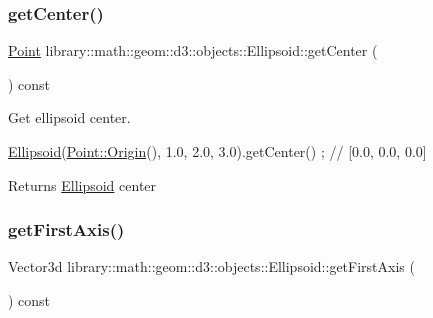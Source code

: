 \subsubsection{\texorpdfstring{get\+Center()}{getCenter()}}
{\footnotesize\ttfamily \hyperlink{classlibrary_1_1math_1_1geom_1_1d3_1_1objects_1_1_point}{Point} library\+::math\+::geom\+::d3\+::objects\+::\+Ellipsoid\+::get\+Center (\begin{DoxyParamCaption}{ }\end{DoxyParamCaption}) const}



Get ellipsoid center. 


\begin{DoxyCode}
\hyperlink{classlibrary_1_1math_1_1geom_1_1d3_1_1objects_1_1_ellipsoid_aae81fe0edc7f0e8d4590ea89ae73cb14}{Ellipsoid}(\hyperlink{classlibrary_1_1math_1_1geom_1_1d3_1_1objects_1_1_point_ab2a38e285c562e50bf350272c083986f}{Point::Origin}(), 1.0, 2.0, 3.0).getCenter() ; \textcolor{comment}{// [0.0, 0.0, 0.0]}
\end{DoxyCode}


\begin{DoxyReturn}{Returns}
\hyperlink{classlibrary_1_1math_1_1geom_1_1d3_1_1objects_1_1_ellipsoid}{Ellipsoid} center 
\end{DoxyReturn}
\mbox{\label{classlibrary_1_1math_1_1geom_1_1d3_1_1objects_1_1_ellipsoid_a155ca01528d96ae76bfcbb155c832a20}} 
\subsubsection{\texorpdfstring{get\+First\+Axis()}{getFirstAxis()}}
{\footnotesize\ttfamily Vector3d library\+::math\+::geom\+::d3\+::objects\+::\+Ellipsoid\+::get\+First\+Axis (\begin{DoxyParamCaption}{ }\end{DoxyParamCaption}) const}

\mbox{\label{classlibrary_1_1math_1_1geom_1_1d3_1_1objects_1_1_ellipsoid_a8219b05b4c6afcd71e915d10b6129baf}} 

